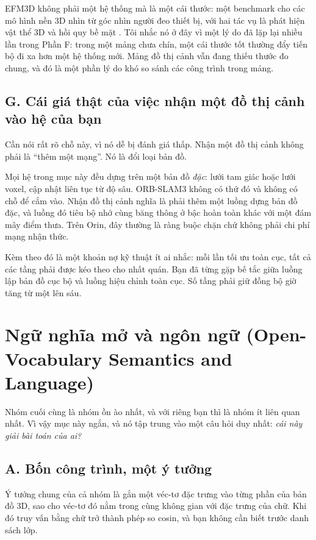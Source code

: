 \documentclass[../../deep_learning.tex]{subfiles}
\begin{document}
EFM3D không phải một hệ thống mà là một cái thước: một benchmark cho các mô hình nền 3D nhìn từ góc nhìn người đeo thiết bị, với hai tác vụ là phát hiện vật thể 3D và hồi quy bề mặt \cite{straub2024efm3d}. Tôi nhắc nó ở đây vì một lý do đã lặp lại nhiều lần trong Phần F: trong một mảng chưa chín, một cái thước tốt thường đẩy tiến bộ đi xa hơn một hệ thống mới. Mảng đồ thị cảnh vẫn đang thiếu thước đo chung, và đó là một phần lý do khó so sánh các công trình trong mảng.

\subsection{G. Cái giá thật của việc nhận một đồ thị cảnh vào hệ của bạn}
Cần nói rất rõ chỗ này, vì nó dễ bị đánh giá thấp. Nhận một đồ thị cảnh không phải là ``thêm một mạng''. Nó là đổi loại bản đồ.

Mọi hệ trong mục này đều dựng trên một bản đồ \emph{đặc}: lưới tam giác hoặc lưới voxel, cập nhật liên tục từ độ sâu. ORB-SLAM3 không có thứ đó và không có chỗ để cắm vào. Nhận đồ thị cảnh nghĩa là phải thêm một luồng dựng bản đồ đặc, và luồng đó tiêu bộ nhớ cùng băng thông ở bậc hoàn toàn khác với một đám mây điểm thưa. Trên Orin, đây thường là ràng buộc chặn chứ không phải chi phí mạng nhận thức.

Kèm theo đó là một khoản nợ kỹ thuật ít ai nhắc: mỗi lần tối ưu toàn cục, tất cả các tầng phải được kéo theo cho nhất quán. Bạn đã từng gặp bế tắc giữa luồng lập bản đồ cục bộ và luồng hiệu chỉnh toàn cục. Số tầng phải giữ đồng bộ giờ tăng từ một lên sáu.

\section{Ngữ nghĩa mở và ngôn ngữ (Open-Vocabulary Semantics and Language)}
Nhóm cuối cùng là nhóm ồn ào nhất, và với riêng bạn thì là nhóm ít liên quan nhất. Vì vậy mục này ngắn, và nó tập trung vào một câu hỏi duy nhất: \emph{cái này giải bài toán của ai?}

\subsection{A. Bốn công trình, một ý tưởng}
Ý tưởng chung của cả nhóm là gắn một véc-tơ đặc trưng vào từng phần của bản đồ 3D, sao cho véc-tơ đó nằm trong cùng không gian với đặc trưng của chữ. Khi đó truy vấn bằng chữ trở thành phép so cosin, và bạn không cần biết trước danh sách lớp.
\end{document}

